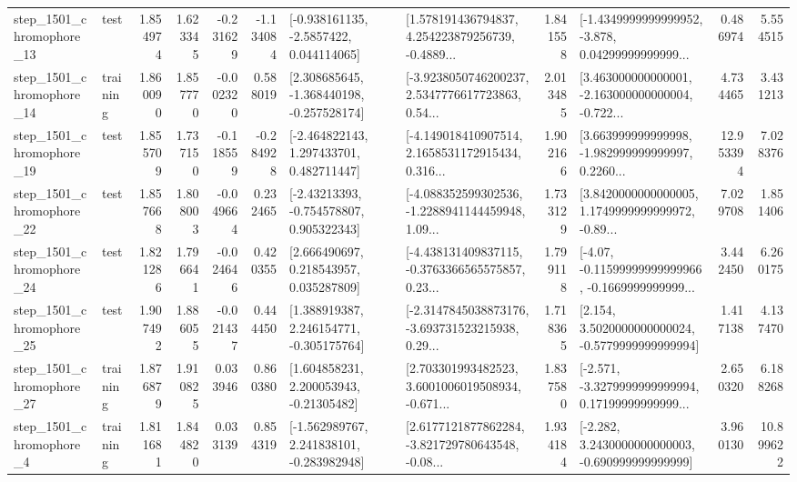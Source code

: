 \begin{tabular}{llrrrrllrlrr}
 step\_1501\_chromophore\_13 &      test &      1.854974 &    1.623345 &     -0.231629 & -1.134084 &     [-0.938161135, -2.5857422, 0.044114065] &  [1.578191436794837, 4.254223879256739, -0.4889... &       1.841558 &  [-1.4349999999999952, -3.878, 0.04299999999999... &            0.486974 &          5.554515 \\
 step\_1501\_chromophore\_14 &  training &      1.860090 &    1.857770 &     -0.002320 &  0.588019 &   [2.308685645, -1.368440198, -0.257528174] &  [-3.9238050746200237, 2.5347776617723863, 0.54... &       2.013485 &  [3.463000000000001, -2.163000000000004, -0.722... &            4.734465 &          3.431213 \\
 step\_1501\_chromophore\_19 &      test &      1.855709 &    1.737150 &     -0.118559 & -0.284928 &    [-2.464822143, 1.297433701, 0.482711447] &  [-4.149018410907514, 2.1658531172915434, 0.316... &       1.902166 &  [3.663999999999998, -1.982999999999997, 0.2260... &           12.953394 &          7.028376 \\
 step\_1501\_chromophore\_22 &      test &      1.857668 &    1.808003 &     -0.049664 &  0.232465 &    [-2.43213393, -0.754578807, 0.905322343] &  [-4.088352599302536, -1.2288941144459948, 1.09... &       1.733129 &  [3.8420000000000005, 1.1749999999999972, -0.89... &            7.029708 &          1.851406 \\
 step\_1501\_chromophore\_24 &      test &      1.821286 &    1.796641 &     -0.024646 &  0.420355 &     [2.666490697, 0.218543957, 0.035287809] &  [-4.438131409837115, -0.3763366565575857, 0.23... &       1.799118 &  [-4.07, -0.11599999999999966, -0.1669999999999... &            3.442450 &          6.260175 \\
 step\_1501\_chromophore\_25 &      test &      1.907492 &    1.886055 &     -0.021437 &  0.444450 &    [1.388919387, 2.246154771, -0.305175764] &  [-2.3147845038873176, -3.693731523215938, 0.29... &       1.718365 &   [2.154, 3.5020000000000024, -0.5779999999999994] &            1.417138 &          4.137470 \\
 step\_1501\_chromophore\_27 &  training &      1.876879 &    1.910825 &      0.033946 &  0.860380 &     [1.604858231, 2.200053943, -0.21305482] &  [2.703301993482523, 3.6001006019508934, -0.671... &       1.837580 &  [-2.571, -3.3279999999999994, 0.17199999999999... &            2.650320 &          6.188268 \\
  step\_1501\_chromophore\_4 &  training &      1.811681 &    1.844820 &      0.033139 &  0.854319 &   [-1.562989767, 2.241838101, -0.283982948] &  [2.6177121877862284, -3.821729780643548, -0.08... &       1.934184 &   [-2.282, 3.2430000000000003, -0.690999999999999] &            3.960130 &         10.899622 \\

\end{tabular}
